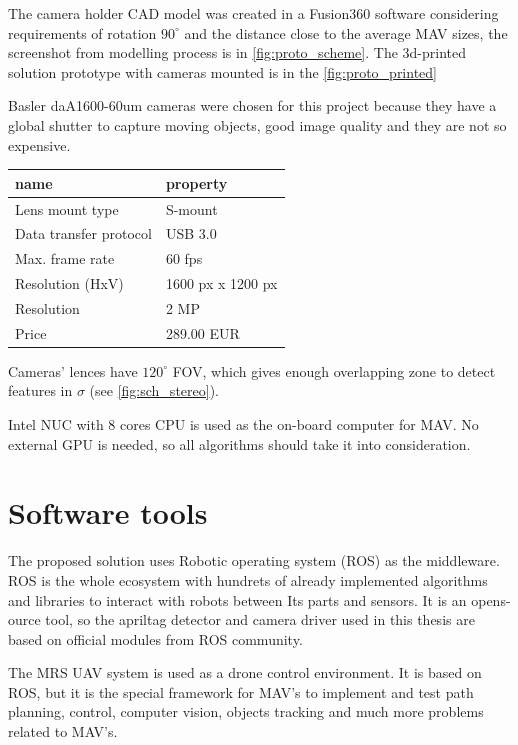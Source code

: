 The camera holder CAD model was created in a Fusion360 software considering requirements of rotation $90^\circ$ and the distance close to the average MAV sizes, the screenshot from modelling process is in \autoref{fig:proto_scheme}.
The 3d-printed solution prototype with cameras mounted is in the \autoref{fig:proto_printed}

Basler daA1600-60um cameras were chosen for this project because they have a global shutter to capture moving objects, good image quality and they are not so expensive.
\begin{center}
    \begin{tabular}{ l l }
    \hline
    name                   & property          \\ \hline
    Lens mount type        & S-mount           \\
    Data transfer protocol & USB 3.0           \\
    Max. frame rate        & 60 fps            \\
    Resolution (HxV)       & 1600 px x 1200 px \\
    Resolution             & 2 MP              \\
    Price                  & 289.00 EUR        \\ \hline
    \end{tabular}
\end{center}

Cameras' lences have $120^\circ$ FOV, which gives enough overlapping zone to detect features in $\sigma$ (see \autoref{fig:sch_stereo}).

Intel NUC with 8 cores CPU is used as the on-board computer for MAV. 
No external GPU is needed, so all algorithms should take it into consideration.

\section{Software tools}
\label{sec:impl_software}

The proposed solution uses Robotic operating system (ROS)\cite{Rospaper} as the middleware.
ROS is the whole ecosystem with hundrets of already implemented algorithms and libraries to interact with robots between Its parts and sensors.
It is an opens-ource tool, so the apriltag detector and camera driver used in this thesis are based on official modules from ROS community.

The MRS UAV system \cite{Baca2021} is used as a drone control environment. It is based on ROS, but it is the special framework for MAV's to implement and test path planning, control, computer vision, objects tracking and much more problems related to MAV's.

